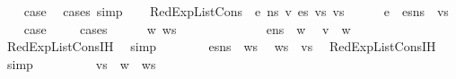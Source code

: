 \begin{isabellebody}
\ \ \isamarkupfalse%
\ {\isacharquery}{\kern0pt}case\ \isamarkupfalse%
\ {\isacharparenleft}{\kern0pt}cases{\isacharsemicolon}{\kern0pt}\ simp{\isacharparenright}{\kern0pt}\isanewline
{}\isamarkupfalse%
\isanewline
\ \ \isamarkupfalse%
\ {\isacharparenleft}{\kern0pt}RedExpListCons\ {\isasymOmega}\ e\ n{\isacharunderscore}{\kern0pt}s\ v\ es\ vs{\isacharprime}{\kern0pt}\ vs{\isacharprime}{\kern0pt}{\isacharprime}{\kern0pt}{\isacharparenright}{\kern0pt}\isanewline
\ \ \isamarkupfalse%
\ {\isachardoublequoteopen}{\isasymLambda}{\isacharcomma}{\kern0pt}{\isasymGamma}{\isacharcomma}{\kern0pt}{\isasymOmega}\ {\isasymturnstile}\ {\isasymlangle}e\ {\isacharhash}{\kern0pt}\ es{\isacharcomma}{\kern0pt}n{\isacharunderscore}{\kern0pt}s{\isasymrangle}\ {\isacharbrackleft}{\kern0pt}{\isasymDown}{\isacharbrackright}{\kern0pt}\ vs{\isacharprime}{\kern0pt}{\isacharprime}{\kern0pt}{\isachardoublequoteclose}\isanewline
\ \ \isamarkupfalse%
\ {\isacharquery}{\kern0pt}case\ \isanewline
\ \ \isamarkupfalse%
\ cases\isanewline
\ \ \ \ \isamarkupfalse%
\ w\ ws\ \ \ \ \ \ \isanewline
\ \ \ \ \isamarkupfalse%
\ {\isachardoublequoteopen}{\isasymLambda}{\isacharcomma}{\kern0pt}{\isasymGamma}{\isacharcomma}{\kern0pt}{\isasymOmega}\ {\isasymturnstile}\ {\isasymlangle}e{\isacharcomma}{\kern0pt}n{\isacharunderscore}{\kern0pt}s{\isasymrangle}\ {\isasymDown}\ w{\isachardoublequoteclose}\ \isamarkupfalse%
\ {\isachardoublequoteopen}v\ {\isacharequal}{\kern0pt}\ w{\isachardoublequoteclose}\ \isamarkupfalse%
\ RedExpListCons{\isachardot}{\kern0pt}IH\ \isamarkupfalse%
\ simp\isanewline
\ \ \ \ \isamarkupfalse%
\ {\isachardoublequoteopen}{\isasymLambda}{\isacharcomma}{\kern0pt}{\isasymGamma}{\isacharcomma}{\kern0pt}{\isasymOmega}\ {\isasymturnstile}\ {\isasymlangle}es{\isacharcomma}{\kern0pt}n{\isacharunderscore}{\kern0pt}s{\isasymrangle}\ {\isacharbrackleft}{\kern0pt}{\isasymDown}{\isacharbrackright}{\kern0pt}\ ws{\isachardoublequoteclose}\ \isamarkupfalse%
\ {\isachardoublequoteopen}ws\ {\isacharequal}{\kern0pt}\ vs{\isacharprime}{\kern0pt}{\isachardoublequoteclose}\ \isamarkupfalse%
\ RedExpListCons{\isachardot}{\kern0pt}IH\ \isamarkupfalse%
\ simp\ \ \isanewline
\ \ \ \ \isamarkupfalse%
\ \isamarkupfalse%
\ {\isachardoublequoteopen}vs{\isacharprime}{\kern0pt}{\isacharprime}{\kern0pt}\ {\isacharequal}{\kern0pt}\ w\ {\isacharhash}{\kern0pt}\ ws{\isachardoublequoteclose}\isanewline

\end{isabellebody}
